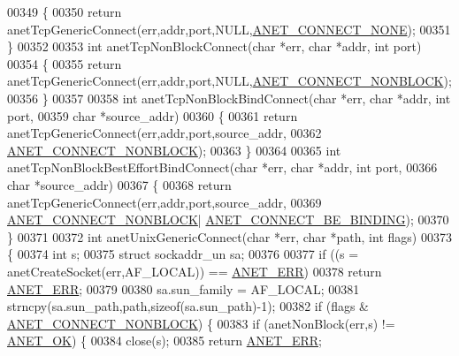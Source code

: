 \begin{DoxyCode}
{{{{{{{{{{{{{{{{{{00349 \{
00350     \textcolor{keywordflow}{return} anetTcpGenericConnect(err,addr,port,NULL,\hyperlink{anet_8c_a8e16527c2634344c5ff2d2c3db91d318}{ANET\_CONNECT\_NONE});
00351 \}
00352 
00353 \textcolor{keywordtype}{int} anetTcpNonBlockConnect(\textcolor{keywordtype}{char} *err, \textcolor{keywordtype}{char} *addr, \textcolor{keywordtype}{int} port)
00354 \{
00355     \textcolor{keywordflow}{return} anetTcpGenericConnect(err,addr,port,NULL,\hyperlink{anet_8c_a487909d18aa88f156b4ef393bc9ceaed}{ANET\_CONNECT\_NONBLOCK});
00356 \}
00357 
00358 \textcolor{keywordtype}{int} anetTcpNonBlockBindConnect(\textcolor{keywordtype}{char} *err, \textcolor{keywordtype}{char} *addr, \textcolor{keywordtype}{int} port,
00359                                \textcolor{keywordtype}{char} *source\_addr)
00360 \{
00361     \textcolor{keywordflow}{return} anetTcpGenericConnect(err,addr,port,source\_addr,
00362             \hyperlink{anet_8c_a487909d18aa88f156b4ef393bc9ceaed}{ANET\_CONNECT\_NONBLOCK});
00363 \}
00364 
00365 \textcolor{keywordtype}{int} anetTcpNonBlockBestEffortBindConnect(\textcolor{keywordtype}{char} *err, \textcolor{keywordtype}{char} *addr, \textcolor{keywordtype}{int} port,
00366                                          \textcolor{keywordtype}{char} *source\_addr)
00367 \{
00368     \textcolor{keywordflow}{return} anetTcpGenericConnect(err,addr,port,source\_addr,
00369             \hyperlink{anet_8c_a487909d18aa88f156b4ef393bc9ceaed}{ANET\_CONNECT\_NONBLOCK}|
      \hyperlink{anet_8c_ad7a12e96a6a3deac27f3fb90db759d8b}{ANET\_CONNECT\_BE\_BINDING});
00370 \}
00371 
00372 \textcolor{keywordtype}{int} anetUnixGenericConnect(\textcolor{keywordtype}{char} *err, \textcolor{keywordtype}{char} *path, \textcolor{keywordtype}{int} flags)
00373 \{
00374     \textcolor{keywordtype}{int} s;
00375     \textcolor{keyword}{struct} sockaddr\_un sa;
00376 
00377     \textcolor{keywordflow}{if} ((s = anetCreateSocket(err,AF\_LOCAL)) == \hyperlink{anet_8h_a0697b7774a7e0f4ef141839fe93536fe}{ANET\_ERR})
00378         \textcolor{keywordflow}{return} \hyperlink{anet_8h_a0697b7774a7e0f4ef141839fe93536fe}{ANET\_ERR};
00379 
00380     sa.sun\_family = AF\_LOCAL;
00381     strncpy(sa.sun\_path,path,\textcolor{keyword}{sizeof}(sa.sun\_path)-1);
00382     \textcolor{keywordflow}{if} (flags & \hyperlink{anet_8c_a487909d18aa88f156b4ef393bc9ceaed}{ANET\_CONNECT\_NONBLOCK}) \{
00383         \textcolor{keywordflow}{if} (anetNonBlock(err,s) != \hyperlink{anet_8h_a25fb91ccc6457153f6d2e21380d4c6cf}{ANET\_OK}) \{
00384             close(s);
00385             \textcolor{keywordflow}{return} \hyperlink{anet_8h_a0697b7774a7e0f4ef141839fe93536fe}{ANET\_ERR};
}}}}}}}}}}}}}}}}}}
\end{DoxyCode}
